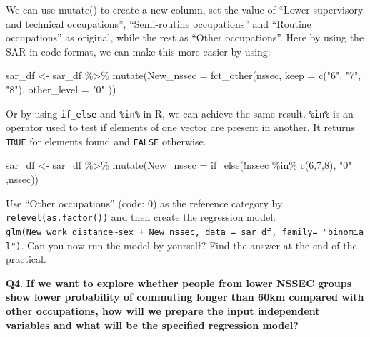 \documentclass[
  letterpaper,
  DIV=11,
  numbers=noendperiod]{scrreprt}
\newenvironment{Shaded}{\begin{snugshade}}{\end{snugshade}}
\newcommand{\AttributeTok}[1]{\textcolor[rgb]{0.40,0.45,0.13}{#1}}
\newcommand{\DecValTok}[1]{\textcolor[rgb]{0.68,0.00,0.00}{#1}}
\newcommand{\FunctionTok}[1]{\textcolor[rgb]{0.28,0.35,0.67}{#1}}
\newcommand{\NormalTok}[1]{\textcolor[rgb]{0.00,0.23,0.31}{#1}}
\newcommand{\OtherTok}[1]{\textcolor[rgb]{0.00,0.23,0.31}{#1}}
\newcommand{\SpecialCharTok}[1]{\textcolor[rgb]{0.37,0.37,0.37}{#1}}
\newcommand{\StringTok}[1]{\textcolor[rgb]{0.13,0.47,0.30}{#1}}
\begin{document}
We can use mutate() to create a new column, set the value of ``Lower
supervisory and technical occupations'', ``Semi-routine occupations''
and ``Routine occupations'' as original, while the rest as ``Other
occupations''. Here by using the SAR in code format, we can make this
more easier by using:

\begin{Shaded}
\begin{Highlighting}[]
\NormalTok{sar\_df }\OtherTok{\textless{}{-}}\NormalTok{ sar\_df }\SpecialCharTok{\%\textgreater{}\%} \FunctionTok{mutate}\NormalTok{(}\AttributeTok{New\_nssec =} \FunctionTok{fct\_other}\NormalTok{(nssec,   }\AttributeTok{keep =} \FunctionTok{c}\NormalTok{(}\StringTok{"6"}\NormalTok{, }\StringTok{"7"}\NormalTok{, }\StringTok{"8"}\NormalTok{),   }\AttributeTok{other\_level =} \StringTok{"0"}\NormalTok{ ))}
\end{Highlighting}
\end{Shaded}

Or by using \texttt{if\_else} and \texttt{\%in\%} in R, we can achieve
the same result. \texttt{\%in\%} is an operator used to test if elements
of one vector are present in another. It returns \texttt{TRUE} for
elements found and \texttt{FALSE} otherwise.

\begin{Shaded}
\begin{Highlighting}[]
\NormalTok{sar\_df }\OtherTok{\textless{}{-}}\NormalTok{ sar\_df }\SpecialCharTok{\%\textgreater{}\%} \FunctionTok{mutate}\NormalTok{(}\AttributeTok{New\_nssec =} \FunctionTok{if\_else}\NormalTok{(}\SpecialCharTok{!}\NormalTok{nssec }\SpecialCharTok{\%in\%} \FunctionTok{c}\NormalTok{(}\DecValTok{6}\NormalTok{,}\DecValTok{7}\NormalTok{,}\DecValTok{8}\NormalTok{), }\StringTok{"0"}\NormalTok{ ,nssec))}
\end{Highlighting}
\end{Shaded}

Use ``Other occupations'' (code: 0) as the reference category by
\texttt{relevel(as.factor())} and then create the regression model:
\texttt{glm(New\_work\_distance\textasciitilde{}sex\ +\ New\_nssec,\ data\ =\ sar\_df,\ family=\ "binomial")}.
Can you now run the model by yourself? Find the answer at the end of the
practical.

\textbf{Q4}. \textbf{If we want to explore whether people from lower
NSSEC groups show lower probability of commuting longer than 60km
compared with other occupations, how will we prepare the input
independent variables and what will be the specified regression model?}
\end{document}
